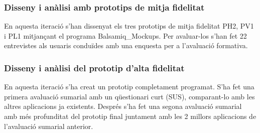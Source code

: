 \subsubsection{Disseny i anàlisi amb prototips de mitja fidelitat}
En aquesta iteració s'han dissenyat els tres prototips de mitja fidelitat PH2, PV1 i PL1 mitjançant el programa \gls{Balsamiq_Mockups}. Per avaluar-los s'han fet 22 entrevistes als usuaris conduïdes amb una enquesta per a l'avaluació formativa.
\subsubsection{Disseny i anàlisi del prototip d'alta fidelitat}
En aquesta iteració s'ha creat un prototip completament programat. S'ha fet una primera avaluació sumarial amb un qüestionari curt (SUS), comparant-lo amb les altres aplicacions ja existents. Després s'ha fet una segona avaluació sumarial amb més profunditat del prototip final juntament amb les 2 millors aplicacions de l'avaluació sumarial anterior. 
